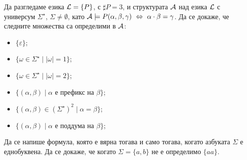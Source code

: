 \begin{problem}
  Да разгледаме езика $\mathcal{L} = \{P\}$, с $\sharp P = 3$, и структурата $\mathcal{A}$ над езика $\mathcal{L}$ с универсум $\Sigma^\star$, $\Sigma \neq \emptyset$,
  като $\mathcal{A} \models P(\alpha,\beta,\gamma) \ \Leftrightarrow\  \alpha \cdot \beta = \gamma$.
  Да се докаже, че следните множества са определими в $\mathcal{A}$:
  \begin{itemize}
  \item
    $\{\varepsilon\}$;
  \item
    $\{\omega \in \Sigma^\star \mid |\omega| = 1\}$;
  \item
    $\{\omega \in \Sigma^\star \mid |\omega| = 2\}$;
  \item
    $\{(\alpha,\beta) \mid \alpha \text{ е префикс на }\beta\}$;
  \item
    $\{(\alpha,\beta) \in (\Sigma^\star)^2 \mid \alpha = \beta\}$;
  \item
    $\{(\alpha,\beta) \mid \alpha \text{ е поддума на }\beta\}$;
  \end{itemize}
  Да се напише формула, която е вярна тогава и само тогава, когато азбуката $\Sigma$ е еднобуквена.
  Да се докаже, че когато $\Sigma = \{a,b\}$ не е определимо $\{aa\}$.
\end{problem}




